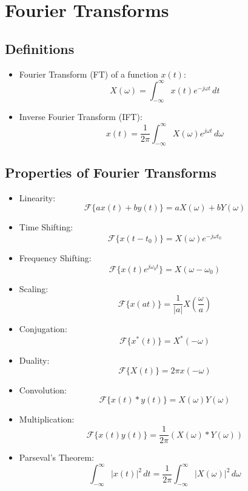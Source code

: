\documentclass[12pt]{article}
\begin{document}
\section{Fourier Transforms}

\subsection{Definitions}
\begin{itemize}
    \item Fourier Transform (FT) of a function \( x(t) \):
    \[
    X(\omega) = \int_{-\infty}^{\infty} x(t) e^{-j\omega t} \, dt
    \]
    \item Inverse Fourier Transform (IFT):
    \[
    x(t) = \frac{1}{2\pi} \int_{-\infty}^{\infty} X(\omega) e^{j\omega t} \, d\omega
    \]
\end{itemize}

\subsection{Properties of Fourier Transforms}
\begin{itemize}
    \item Linearity:
    \[
    \mathcal{F}\{a x(t) + b y(t)\} = a X(\omega) + b Y(\omega)
    \]
    \item Time Shifting:
    \[
    \mathcal{F}\{x(t - t_0)\} = X(\omega) e^{-j\omega t_0}
    \]
    \item Frequency Shifting:
    \[
    \mathcal{F}\{x(t) e^{j\omega_0 t}\} = X(\omega - \omega_0)
    \]
    \item Scaling:
    \[
    \mathcal{F}\{x(at)\} = \frac{1}{|a|} X\left(\frac{\omega}{a}\right)
    \]
    \item Conjugation:
    \[
    \mathcal{F}\{x^*(t)\} = X^*(-\omega)
    \]
    \item Duality:
    \[
    \mathcal{F}\{X(t)\} = 2\pi x(-\omega)
    \]
    \item Convolution:
    \[
    \mathcal{F}\{x(t) * y(t)\} = X(\omega) Y(\omega)
    \]
    \item Multiplication:
    \[
    \mathcal{F}\{x(t) y(t)\} = \frac{1}{2\pi} \left( X(\omega) * Y(\omega) \right)
    \]
    \item Parseval’s Theorem:
    \[
    \int_{-\infty}^{\infty} |x(t)|^2 \, dt = \frac{1}{2\pi} \int_{-\infty}^{\infty} |X(\omega)|^2 \, d\omega
    \]
\end{itemize}
\end{document}
